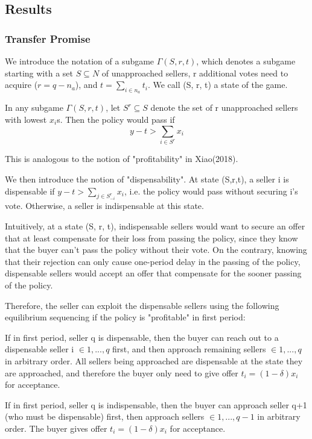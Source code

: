 \documentclass[ProjectGAZ]{subfiles}
\begin{document}
\subsection{Results}\label{subsec:CnZ-Results}
\subsubsection{Transfer Promise}
We introduce the notation of a subgame $\Gamma(S,r,t)$, which denotes a subgame starting with a set $S\subseteq N$ of unapproached sellers, r additional votes need to acquire ($r = q - n_a$), and $t = \sum_{i \in n_a} t_i$. We call (S, r, t) a state of the game.

In any subgame  $\Gamma(S,r,t)$, let $S^r \subseteq S$ denote the set of r unapproached sellers with lowest $x_i$s. Then the policy would pass if 
\begin{equation}
	y - t > \sum_{i \in S^r} x_i
\end{equation}

This is analogous to the notion of "profitability" in Xiao(2018).

We then introduce the notion of "dispensability". At state (S,r,t), a seller i is dispensable if $y-t > \sum_{j \in S_{-i}^r} x_i$, i.e. the policy would pass without securing i's vote. Otherwise, a seller is indispensable at this state.

Intuitively, at a state (S, r, t), indispensable sellers would want to secure an offer that at least compensate for their loss from passing the policy, since they know that the buyer can't pass the policy without their vote. On the contrary, knowing that their rejection can only cause one-period delay in the passing of the policy, dispensable sellers would accept an offer that compensate for the sooner passing of the policy.

Therefore, the seller can exploit the dispensable sellers using the following equilibrium sequencing if the policy is "profitable" in first period:

If in first period, seller q is dispensable, then the buyer can reach out to a dispensable seller i $\in{1, ..., q}$ first, and then approach remaining sellers $\in{1, ..., q}$ in arbitrary order. All sellers being approached are dispensable at the state they are approached, and therefore the buyer only need to give offer $t_i = (1-\delta)x_i$ for acceptance.

If in first period, seller q is indispensable, then the buyer can approach seller q+1 (who must be dispensable) first, then approach sellers $\in {1, ..., q-1}$ in arbitrary order. The buyer gives offer $t_i = (1-\delta)x_i$ for acceptance.
\end{document}
